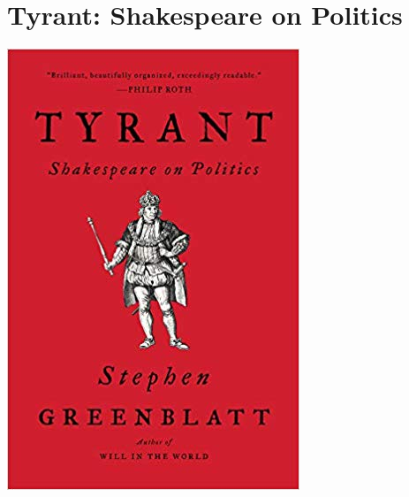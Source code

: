 \documentclass{tufte-handout}
\makeatletter
\newcommand{\varcaption}[2][0pt]{%
  \gsetlength{\@tufte@caption@vertical@offset}{-#1}%
  \gdef\@tufte@stored@varcaption{#2}%
}
\gdef\@tufte@stored@varcaption{} %
\makeatother
\begin{document}
\section*{Tyrant: Shakespeare on Politics}
\begin{marginfigure}[\baselineskip]
   \includegraphics[width=\linewidth]{images/tyrant.jpg}
   \varcaption{\href{https://wwnorton.com/books/9780393356977}{Publisher Link}, \href{https://www.amazon.com/Tyrant-Shakespeare-Politics-Stephen-Greenblatt/dp/0393356973/}{Amazon Link}}
\end{marginfigure}
\end{document}
